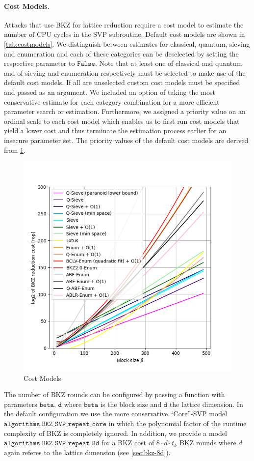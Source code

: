 \paragraph{Cost Models.} Attacks that use BKZ for lattice reduction require a cost model to estimate the number of CPU cycles in the SVP subroutine. Default cost models are shown in \cref{tab:costmodels}. We distinguish between estimates for classical, quantum, sieving and enumeration and each of these categories can be deselected by setting the respective parameter to $\texttt{False}$. Note that at least one of classical and quantum and of sieving and enumeration respectively must be selected to make use of the default cost models. If all are unselected custom cost models must be specified and passed as an argument. We included an option of taking the most conservative estimate for each category combination for a more efficient parameter search or estimation. Furthermore, we assigned a priority value on an ordinal scale to each cost model which enables us to first run cost models that yield a lower cost and thus terminate the estimation process earlier for an insecure parameter set. The priority values of the default cost models are derived from \cref{fig:costmodels}.
\begin{figure}[h]
    \centering
    \includegraphics[width=1\textwidth]{graphics/cost_models.png}
    \caption{Cost Models}\label{fig:costmodels}
\end{figure}
The number of BKZ rounds can be configured by passing a function with parameters $\texttt{beta, d}$ where $\texttt{beta}$ is the block size and $\texttt{d}$ the lattice dimension. In the default configuration we use the more conservative ``Core''-SVP model $\texttt{algorithms.BKZ\_SVP\_repeat\_core}$ \cite{ADPS16} in which the polynomial factor of the runtime complexity of BKZ is completely ignored. In addition, we provide a model $\texttt{algorithms.BKZ\_SVP\_repeat\_8d}$ for a BKZ cost of $8 \cdot d \cdot t_k$ BKZ rounds where $d$ again referes to the lattice dimension (see \cref{sec:bkz-8d}).


